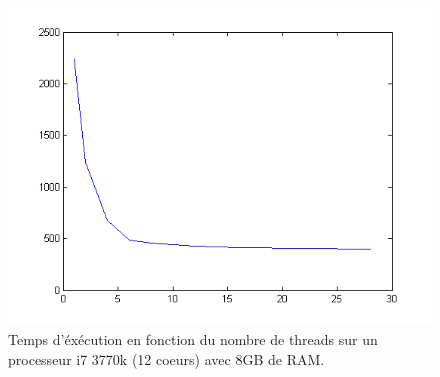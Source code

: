 \documentclass{article}
\begin{document}
\begin{figure}[ht]
	\centering
	\includegraphics[scale=0.8]{img/time.png}
	\caption{Temps d'éxécution en fonction du nombre de threads sur un processeur i7 3770k (12 coeurs)
	avec 8GB de RAM.}
	\label{fig:time}
\end{figure}
\end{document}
